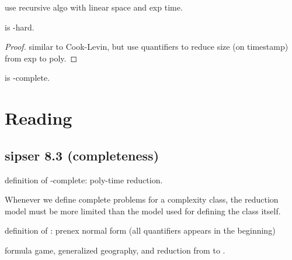 \documentclass{article}
\begin{document}
use recursive algo with linear space and exp time.

\begin{theorem}
   is \PSPACE-hard.
\end{theorem}

\begin{proof}
  similar to Cook-Levin, but use quantifiers to reduce size (on timestamp) from exp to poly.
\end{proof}

\begin{corollary}
   is \PSPACE-complete.
\end{corollary}

\section{Reading}

\subsection{sipser 8.3 (\PSPACE completeness)}

definition of \PSPACE-complete: poly-time reduction.

\begin{remark}
  Whenever we define complete problems for a complexity class, the reduction model must be more limited than the model used for defining the class itself.
\end{remark}

definition of : prenex normal form (all quantifiers appears in the beginning)

formula game, generalized geography, and reduction from  to .
\end{document}
